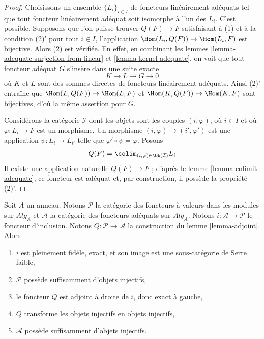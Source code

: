 \begin{proof}
Choisissons un ensemble $\{L_i\}_{i \in I}$ de foncteurs linéairement adéquats tel que
tout foncteur linéairement adéquat soit isomorphe à l'un des $L_i$.
C'est possible. Supposons que l'on puisse trouver $Q(F) \to F$ satisfaisant à (1) et à la condition
(2)' pour tout $i \in I$, l'application $\Hom(L_i, Q(F)) \to \Hom(L_i, F)$
est bijective. Alors (2) est vérifiée. En effet, en combinant les
lemmes \ref{lemma-adequate-surjection-from-linear} et
\ref{lemma-kernel-adequate},
on voit que tout foncteur adéquat $G$ s'insère dans une suite exacte
$$
K \to L \to G \to 0
$$
où $K$ et $L$ sont des sommes directes de foncteurs linéairement adéquats. Ainsi (2)'
entraîne que
$\Hom(L, Q(F)) \to \Hom(L, F)$
et
$\Hom(K, Q(F)) \to \Hom(K, F)$
sont bijectives, d'où la même assertion pour $G$.

\medskip\noindent
Considérons la catégorie $\mathcal{I}$ dont les objets sont les couples
$(i, \varphi)$, où $i \in I$ et où $\varphi : L_i \to F$ est un morphisme.
Un morphisme $(i, \varphi) \to (i', \varphi')$ est une application
$\psi : L_i \to L_{i'}$ telle que $\varphi' \circ \psi = \varphi$.
Posons
$$
Q(F) = \colim_{(i, \varphi) \in \Ob(\mathcal{I})} L_i
$$
Il existe une application naturelle $Q(F) \to F$ ; d'après le
lemme \ref{lemma-colimit-adequate},
ce foncteur est adéquat et, par construction, il possède la propriété (2)'.
\end{proof}

\begin{lemma}
\label{lemma-enough-injectives}
Soit $A$ un anneau. Notons $\mathcal{P}$ la catégorie des foncteurs à valeurs
dans les modules sur $\textit{Alg}_A$ et $\mathcal{A}$ la catégorie des foncteurs
adéquats sur $\textit{Alg}_A$. Notons $i : \mathcal{A} \to \mathcal{P}$
le foncteur d'inclusion. Notons $Q : \mathcal{P} \to \mathcal{A}$
la construction du lemme \ref{lemma-adjoint}.
Alors
\begin{enumerate}
\item $i$ est pleinement fidèle, exact, et son image est une sous-catégorie de Serre faible,
\item $\mathcal{P}$ possède suffisamment d'objets injectifs,
\item le foncteur $Q$ est adjoint à droite de $i$, donc exact à gauche,
\item $Q$ transforme les objets injectifs en objets injectifs,
\item $\mathcal{A}$ possède suffisamment d'objets injectifs.
\end{enumerate}
\end{lemma}

